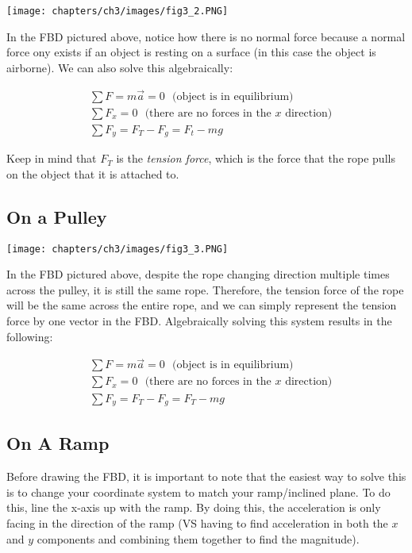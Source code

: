 \begin{center}
	\texttt{[image: chapters/ch3/images/fig3\_2.PNG]}
\end{center}

In the FBD pictured above, notice how there is no normal force because a normal force ony exists if an object is resting on a surface (in this case the object is airborne). We can also solve this algebraically:

$$
	\begin{aligned}
		&\sum F = m\vec{a} = 0 \:\:\:\text{(object is in equilibrium)}\\
		&\sum F_x = 0 \:\:\:\text{(there are no forces in the $x$ direction)}\\
		&\sum F_y = F_T - F_g = F_t - mg
	\end{aligned}
$$

Keep in mind that $F_T$ is the \textit{tension force}, which is the force that the rope pulls on the object that it is attached to.

\subsection*{On a Pulley}

\begin{center}
	\texttt{[image: chapters/ch3/images/fig3\_3.PNG]}
\end{center}

In the FBD pictured above, despite the rope changing direction multiple times across the pulley, it is still the same rope. Therefore, the tension force of the rope will be the same across the entire rope, and we can simply represent the tension force by one vector in the FBD. Algebraically solving this system results in the following:

$$
	\begin{aligned}
		&\sum F = m\vec{a} = 0 \:\:\:\text{(object is in equilibrium)}\\
		&\sum F_x = 0 \:\:\:\text{(there are no forces in the $x$ direction)}\\
		&\sum F_y = F_T - F_g = F_T - mg
	\end{aligned}
$$

\subsection*{On A Ramp}

Before drawing the FBD, it is important to note that the easiest way to solve this is to change your coordinate system to match your ramp/inclined plane. To do this, line the x-axis up with the ramp. By doing this, the acceleration is only facing in the direction of the ramp (VS having to find acceleration in both the $x$ and $y$ components and combining them together to find the magnitude).\newpage

